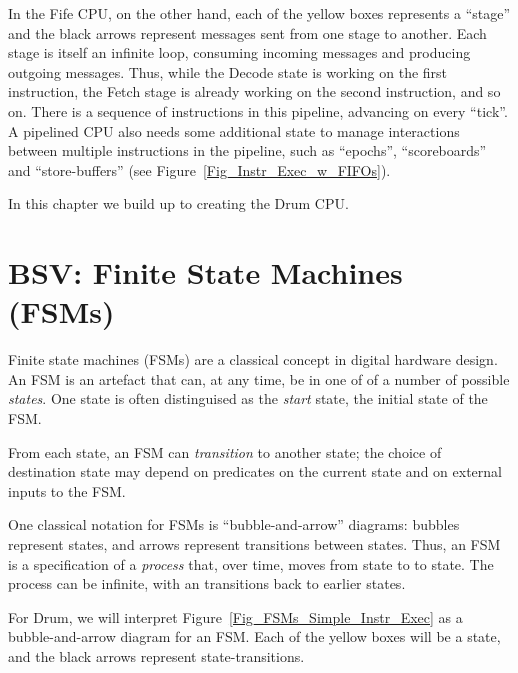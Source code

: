 In the Fife CPU, on the other hand, each of the yellow boxes
represents a ``stage'' and the black arrows represent messages sent
from one stage to another.  Each stage is itself an infinite loop,
consuming incoming messages and producing outgoing messages.  Thus,
while the Decode state is working on the first instruction, the Fetch
stage is already working on the second instruction, and so on.  There
is a sequence of instructions in this pipeline, advancing on every
``tick''.  A pipelined CPU also needs some additional state to manage
interactions between multiple instructions in the pipeline, such as
``epochs'', ``scoreboards'' and ``store-buffers'' (see
Figure~\ref{Fig_Instr_Exec_w_FIFOs}).

In this chapter we build up to creating the Drum CPU.


\section{BSV: Finite State Machines (FSMs)}

\label{Sec_FSMs_FSMs}


Finite state machines (FSMs) are a classical concept in digital
hardware design.  An FSM is an artefact that can, at any time, be in
one of of a number of possible \emph{states}.  One state is often
distinguised as the \emph{start} state, the initial state of the FSM.

From each state, an FSM can \emph{transition} to another state; the
choice of destination state may depend on predicates on the current
state and on external inputs to the FSM.

One classical notation for FSMs is ``bubble-and-arrow'' diagrams:
bubbles represent states, and arrows represent transitions between
states.  Thus, an FSM is a specification of a \emph{process} that,
over time, moves from state to to state.  The process can be infinite,
with an transitions back to earlier states.


For Drum, we will interpret
Figure~\ref{Fig_FSMs_Simple_Instr_Exec} as a bubble-and-arrow diagram
for an FSM.  Each of the yellow boxes will be a state, and the black
arrows represent state-transitions.



